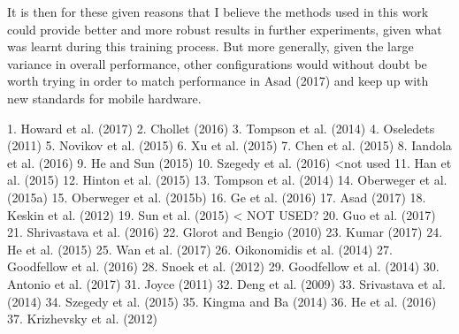 \documentclass{article}
\begin{document}
It is then for these given reasons that I believe the methods used in this work could provide better and more robust results in further experiments, given what was learnt during this training process. But more generally, given the large variance in overall performance, other configurations would without doubt be worth trying in order to match performance in Asad (2017) and keep up with new standards for mobile hardware.

1. Howard et al. (2017)
2. Chollet (2016)
3. Tompson et al. (2014)
4. Oseledets (2011)
5. Novikov et al. (2015)
6. Xu et al. (2015)
7. Chen et al. (2015)
8. Iandola et al. (2016)
9. He and Sun (2015)
10. Szegedy et al. (2016) <not used
11. Han et al. (2015)
12. Hinton et al. (2015)
13. Tompson et al. (2014)
14. Oberweger et al. (2015a)
15. Oberweger et al. (2015b)
16. Ge et al. (2016)
17. Asad (2017)
18. Keskin et al. (2012)
19. Sun et al. (2015) < NOT USED?
20. Guo et al. (2017)
21. Shrivastava et al. (2016)
22. Glorot and Bengio (2010)
23. Kumar (2017)
24. He et al. (2015)
25. Wan et al. (2017)
26. Oikonomidis et al. (2014)
27. Goodfellow et al. (2016)
28. Snoek et al. (2012)
29. Goodfellow et al. (2014)
30. Antonio et al. (2017)
31. Joyce (2011)
32. Deng et al. (2009)
33. Srivastava et al. (2014)
34. Szegedy et al. (2015)
35. Kingma and Ba (2014)
36. He et al. (2016)
37. Krizhevsky et al. (2012)
\end{document}

